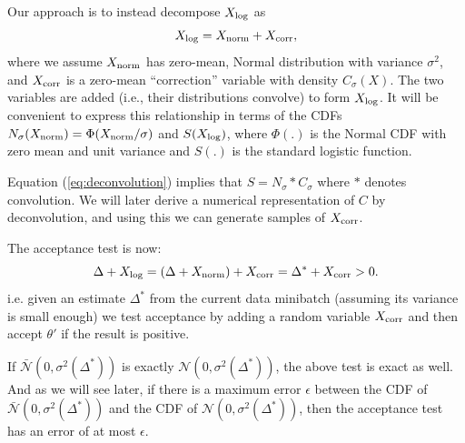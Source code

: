 \documentclass{article}
\begin{document}
Our approach is to instead decompose $X_{\rm log}$ as
\begin{equation}\label{eq:deconvolution}
X_{\rm log} = X_{\rm norm}+X_{\rm corr},
\end{equation}
where we assume $X_{\rm norm}$ has zero-mean, Normal distribution with
variance $\sigma^2$, and $X_{\rm corr}$ is a zero-mean ``correction''
variable with density $C_{\sigma}(X)$.  The two variables are added
(i.e., their distributions convolve) to form $X_{\rm log}$. It will be
convenient to express this relationship in terms of the CDFs $N_{\sigma}(X_{\rm
  norm}) = \Phi(X_{\rm norm}/\sigma)$ and $S(X_{\rm log})$, where
$\Phi(.)$ is the Normal CDF with zero mean and unit variance and
$S(.)$ is the standard logistic function.
 
Equation (\ref{eq:deconvolution}) implies that $S = N_{\sigma} * C_{\sigma}$ where $*$ denotes convolution. We will later
derive a numerical representation of $C$ by deconvolution, and using this we can generate
samples of $X_{\rm corr}$. 

  The acceptance test is now:
\begin{equation}\label{eq:criteria}
\Delta + X_{\rm log} = (\Delta + X_{\rm norm}) + X_{\rm corr} = \Delta^* + X_{\rm corr} >0.
\end{equation}
i.e. given an estimate $\Delta^*$ from the current data minibatch (assuming its
variance is small enough) we test acceptance by adding a random variable $X_{\rm corr}$ and
then accept $\theta'$ if the result is positive.

If $\mathcal{\bar{N}}(0, \sigma^2(\Delta^*))$ is exactly $\mathcal{N}(0, \sigma^2(\Delta^*))$,
the above test is exact as well. And as we will see later,  if there is a maximum error $\epsilon$ between
the CDF of $\mathcal{\bar{N}}(0, \sigma^2(\Delta^*))$ and the CDF of $\mathcal{N}(0, \sigma^2(\Delta^*))$,
then the acceptance test has an error of at most $\epsilon$. 
\end{document}
